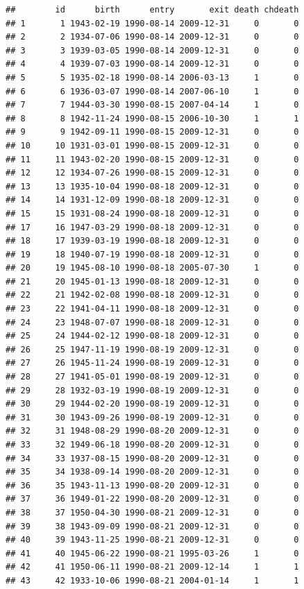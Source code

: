 \documentclass[
]{book}
\theoremstyle{definition}
\theoremstyle{definition}
\theoremstyle{definition}
\theoremstyle{definition}
\theoremstyle{remark}
\begin{document}
\begin{verbatim}
##        id      birth      entry       exit death chdeath
## 1       1 1943-02-19 1990-08-14 2009-12-31     0       0
## 2       2 1934-07-06 1990-08-14 2009-12-31     0       0
## 3       3 1939-03-05 1990-08-14 2009-12-31     0       0
## 4       4 1939-07-03 1990-08-14 2009-12-31     0       0
## 5       5 1935-02-18 1990-08-14 2006-03-13     1       0
## 6       6 1936-03-07 1990-08-14 2007-06-10     1       0
## 7       7 1944-03-30 1990-08-15 2007-04-14     1       0
## 8       8 1942-11-24 1990-08-15 2006-10-30     1       1
## 9       9 1942-09-11 1990-08-15 2009-12-31     0       0
## 10     10 1931-03-01 1990-08-15 2009-12-31     0       0
## 11     11 1943-02-20 1990-08-15 2009-12-31     0       0
## 12     12 1934-07-26 1990-08-15 2009-12-31     0       0
## 13     13 1935-10-04 1990-08-18 2009-12-31     0       0
## 14     14 1931-12-09 1990-08-18 2009-12-31     0       0
## 15     15 1931-08-24 1990-08-18 2009-12-31     0       0
## 17     16 1947-03-29 1990-08-18 2009-12-31     0       0
## 18     17 1939-03-19 1990-08-18 2009-12-31     0       0
## 19     18 1940-07-19 1990-08-18 2009-12-31     0       0
## 20     19 1945-08-10 1990-08-18 2005-07-30     1       0
## 21     20 1945-01-13 1990-08-18 2009-12-31     0       0
## 22     21 1942-02-08 1990-08-18 2009-12-31     0       0
## 23     22 1941-04-11 1990-08-18 2009-12-31     0       0
## 24     23 1948-07-07 1990-08-18 2009-12-31     0       0
## 25     24 1944-02-12 1990-08-18 2009-12-31     0       0
## 26     25 1947-11-19 1990-08-19 2009-12-31     0       0
## 27     26 1945-11-24 1990-08-19 2009-12-31     0       0
## 28     27 1941-05-01 1990-08-19 2009-12-31     0       0
## 29     28 1932-03-19 1990-08-19 2009-12-31     0       0
## 30     29 1944-02-20 1990-08-19 2009-12-31     0       0
## 31     30 1943-09-26 1990-08-19 2009-12-31     0       0
## 32     31 1948-08-29 1990-08-20 2009-12-31     0       0
## 33     32 1949-06-18 1990-08-20 2009-12-31     0       0
## 34     33 1937-08-15 1990-08-20 2009-12-31     0       0
## 35     34 1938-09-14 1990-08-20 2009-12-31     0       0
## 36     35 1943-11-13 1990-08-20 2009-12-31     0       0
## 37     36 1949-01-22 1990-08-20 2009-12-31     0       0
## 38     37 1950-04-30 1990-08-21 2009-12-31     0       0
## 39     38 1943-09-09 1990-08-21 2009-12-31     0       0
## 40     39 1943-11-25 1990-08-21 2009-12-31     0       0
## 41     40 1945-06-22 1990-08-21 1995-03-26     1       0
## 42     41 1950-06-11 1990-08-21 2009-12-14     1       1
## 43     42 1933-10-06 1990-08-21 2004-01-14     1       1

\end{verbatim}
\end{document}
